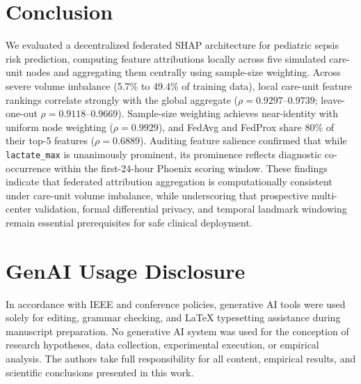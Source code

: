 \documentclass[conference,a4paper]{IEEEtran}
\begin{document}
\section{Conclusion}\label{sec:concl}

We evaluated a decentralized federated SHAP architecture for pediatric sepsis risk prediction, computing feature attributions locally across five simulated care-unit nodes and aggregating them centrally using sample-size weighting. Across severe volume imbalance (5.7\% to 49.4\% of training data), local care-unit feature rankings correlate strongly with the global aggregate ($\rho = 0.9297$--$0.9739$; leave-one-out $\rho = 0.9118$--$0.9669$). Sample-size weighting achieves near-identity with uniform node weighting ($\rho = 0.9929$), and FedAvg and FedProx share 80\% of their top-5 features ($\rho = 0.6889$). Auditing feature salience confirmed that while \texttt{lactate\_max} is unanimously prominent, its prominence reflects diagnostic co-occurrence within the first-24-hour Phoenix scoring window. These findings indicate that federated attribution aggregation is computationally consistent under care-unit volume imbalance, while underscoring that prospective multi-center validation, formal differential privacy, and temporal landmark windowing remain essential prerequisites for safe clinical deployment.

\section*{GenAI Usage Disclosure}
In accordance with IEEE and conference policies, generative AI tools were used solely for editing, grammar checking, and LaTeX typesetting assistance during manuscript preparation. No generative AI system was used for the conception of research hypotheses, data collection, experimental execution, or empirical analysis. The authors take full responsibility for all content, empirical results, and scientific conclusions presented in this work.



\end{document}
